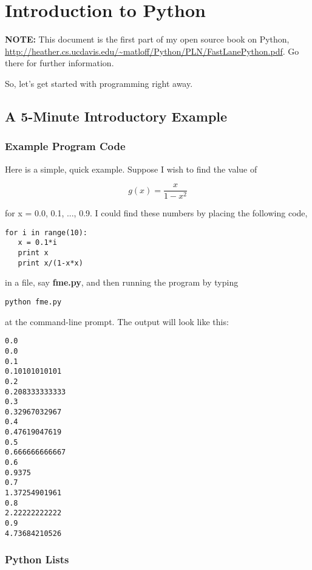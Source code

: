 \chapter{Introduction to Python} 
\label{chap:pyintro}

{\bf NOTE:} This document is the first part of my open source book on
Python,
\url{http://heather.cs.ucdavis.edu/~matloff/Python/PLN/FastLanePython.pdf}.
Go there for further information.

So, let's get started with programming right away.

\section{A 5-Minute Introductory Example}

\subsection{Example Program Code}
\label{veryfirst}

Here is a simple, quick example.  Suppose I wish to find the value of 

$$
g(x) = \frac{x}{1-x^2}
$$

for x = 0.0, 0.1, ..., 0.9.  I could find these numbers by placing the
following code,

\begin{Verbatim}[fontsize=\relsize{-2}]
for i in range(10):
   x = 0.1*i
   print x
   print x/(1-x*x)
\end{Verbatim}

in a file, say {\bf fme.py},
and then running the program by
typing

\begin{Verbatim}[fontsize=\relsize{-2}]
python fme.py
\end{Verbatim}

at the command-line prompt.  The output will look
like this:

\begin{Verbatim}[fontsize=\relsize{-2}]
0.0
0.0
0.1
0.10101010101
0.2
0.208333333333
0.3
0.32967032967
0.4
0.47619047619
0.5
0.666666666667
0.6
0.9375
0.7
1.37254901961
0.8
2.22222222222
0.9
4.73684210526
\end{Verbatim}

\subsection{Python Lists}


